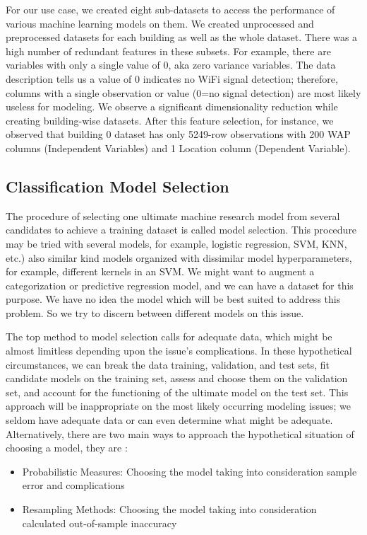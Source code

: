 \documentclass[a4paper,singleside,12pt]{report} %
\begin{document}
			For our use case, we created eight sub-datasets to access the performance of various machine learning models on them. 
			We created unprocessed and preprocessed datasets for each building as well as the whole dataset. 
			There was a high number of redundant features in these subsets. 
			For example, there are variables with only a single value of 0, aka zero variance variables. 
			The data description tells us a value of 0 indicates no WiFi signal detection; therefore, columns with a single observation or value (0=no signal detection) are most likely useless for modeling. 
			We observe a significant dimensionality reduction while creating building-wise datasets. 
			After this feature selection, for instance, we observed that building 0 dataset has only 5249-row observations with 200 WAP columns (Independent Variables) and 1 Location column (Dependent Variable).


			\subsection{Classification Model Selection}
				The procedure of selecting one ultimate machine research model from several candidates to achieve a training dataset is called model selection.
				 This procedure may be tried with several models, for example, logistic regression, SVM, KNN, etc.) also similar kind models organized with dissimilar model hyperparameters, for example, different kernels in an SVM.
				 We might want to augment a categorization or predictive regression model, and we can have a dataset for this purpose.
				 We have no idea the model which will be best suited to address this problem. So we try to discern between different models on this issue. 
				
				The top method to model selection calls for adequate data, which might be almost limitless depending upon the issue's complications.
				 In these hypothetical circumstances, we can break the data training, validation, and test sets, fit candidate models on the training set, assess and choose them on the validation set, and account for the functioning of the ultimate model on the test set.
				 This approach will be inappropriate on the most likely occurring modeling issues; we seldom have adequate data or can even determine what might be adequate.
				 Alternatively, there are two main ways to approach the hypothetical situation of choosing a model, they are :
				
				\begin{itemize}
				
				\item Probabilistic Measures: Choosing the model taking into consideration sample error and complications
				
				\item Resampling Methods: Choosing the model taking into consideration calculated out-of-sample inaccuracy
				
				
				\end{itemize}	
				
\end{document}
